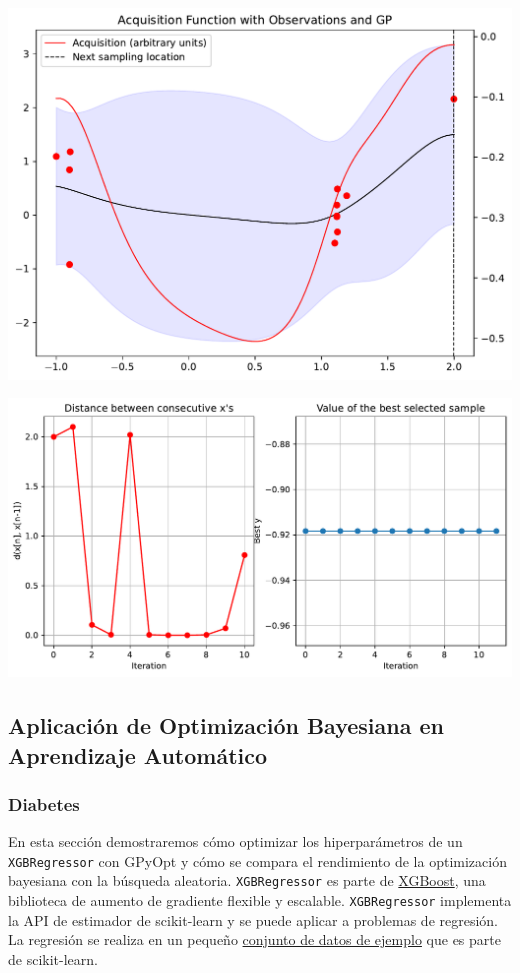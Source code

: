 \documentclass[
  12pt,
  letterpaper,
  DIV=11,
  numbers=noendperiod]{scrartcl}
\begin{document}
\includegraphics{ProyFinal_OptBayesiana_2024_files/figure-pdf/cell-10-output-1.pdf}

\includegraphics{ProyFinal_OptBayesiana_2024_files/figure-pdf/cell-11-output-1.pdf}

\subsection{Aplicación de Optimización Bayesiana en Aprendizaje
Automático}\label{aplicaciuxf3n-de-optimizaciuxf3n-bayesiana-en-aprendizaje-automuxe1tico}

\subsubsection{Diabetes}\label{diabetes}

En esta sección demostraremos cómo optimizar los hiperparámetros de un
\texttt{XGBRegressor} con GPyOpt y cómo se compara el rendimiento de la
optimización bayesiana con la búsqueda aleatoria. \texttt{XGBRegressor}
es parte de \href{https://xgboost.readthedocs.io/}{XGBoost}, una
biblioteca de aumento de gradiente flexible y escalable.
\texttt{XGBRegressor} implementa la API de estimador de scikit-learn y
se puede aplicar a problemas de regresión. La regresión se realiza en un
pequeño
\href{http://scikit-learn.org/stable/modules/generated/sklearn.datasets.load_diabetes.html\#sklearn.datasets.load_diabetes}{conjunto
de datos de ejemplo} que es parte de scikit-learn.
\end{document}
